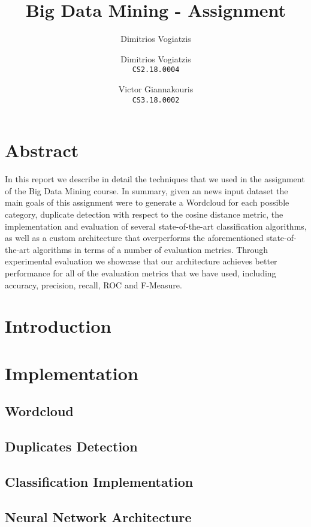 \documentclass[]{article}
\title{Big Data Mining - Assignment}
\author{Dimitrios Vogiatzis}
\author{
	Dimitrios Vogiatzis\\
	\texttt{CS2.18.0004}
	\and
	Victor Giannakouris\\
	\texttt{CS3.18.0002}
}
\begin{document}
\date{}
\maketitle

\section{Abstract}
In this report we describe in detail the techniques that we used in the assignment of the Big Data Mining course. In summary, given an news input dataset the main goals of this assignment were to generate a Wordcloud for each possible category, duplicate detection with respect to the cosine distance metric, the implementation and evaluation of several state-of-the-art classification algorithms, as well as a custom architecture that overperforms the aforementioned state-of-the-art algorithms in terms of a number of evaluation metrics. Through experimental evaluation we showcase that our architecture achieves better performance for all of the evaluation metrics that we have used, including accuracy, precision, recall, ROC and F-Measure.
\section{Introduction}

\section{Implementation}
\subsection{Wordcloud}

\pagebreak
\subsection{Duplicates Detection}

\subsection{Classification Implementation}

\subsection{Neural Network Architecture}




\end{document}
